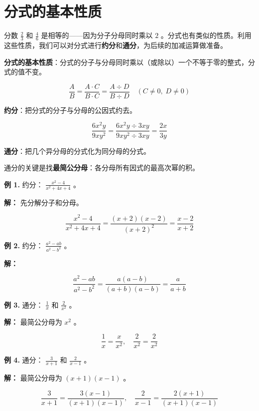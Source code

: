 \section*{分式的基本性质}


\begin{explore}


分数 $\frac{2}{3}$ 和 $\frac{4}{6}$ 是相等的——因为分子分母同时乘以 $2$ 。分式也有类似的性质。利用这些性质，我们可以对分式进行\textbf{约分}和\textbf{通分}，为后续的加减运算做准备。

\end{explore}

\begin{understand}


\textbf{分式的基本性质}：分式的分子与分母同时乘以（或除以）一个不等于零的整式，分式的值不变。

\[
\frac{A}{B} = \frac{A \cdot C}{B \cdot C} = \frac{A \div D}{B \div D} \quad (C \neq 0,\; D \neq 0)
\]


\textbf{约分}：把分式的分子与分母的公因式约去。

\[
\frac{6x^2y}{9xy^2} = \frac{6x^2y \div 3xy}{9xy^2 \div 3xy} = \frac{2x}{3y}
\]


\textbf{通分}：把几个异分母的分式化为同分母的分式。

通分的关键是找\textbf{最简公分母}：各分母所有因式的最高次幂的积。

\end{understand}

\begin{workedexamples}


\textbf{例 1.} 约分： $\frac{x^2 - 4}{x^2 + 4x + 4}$ 。

\textbf{解：} 先分解分子和分母。

\[
\frac{x^2 - 4}{x^2 + 4x + 4} = \frac{(x+2)(x-2)}{(x+2)^2} = \frac{x - 2}{x + 2}
\]


\textbf{例 2.} 约分： $\frac{a^2 - ab}{a^2 - b^2}$ 。

\textbf{解：}

\[
\frac{a^2 - ab}{a^2 - b^2} = \frac{a(a - b)}{(a+b)(a-b)} = \frac{a}{a + b}
\]


\textbf{例 3.} 通分： $\frac{1}{x}$ 和 $\frac{2}{x^2}$ 。

\textbf{解：} 最简公分母为 $x^2$ 。

\[
\frac{1}{x} = \frac{x}{x^2}, \quad \frac{2}{x^2} = \frac{2}{x^2}
\]


\textbf{例 4.} 通分： $\frac{3}{x+1}$ 和 $\frac{2}{x-1}$ 。

\textbf{解：} 最简公分母为 $(x+1)(x-1)$ 。

\[
\frac{3}{x+1} = \frac{3(x-1)}{(x+1)(x-1)}, \quad \frac{2}{x-1} = \frac{2(x+1)}{(x+1)(x-1)}
\]


\end{workedexamples}

